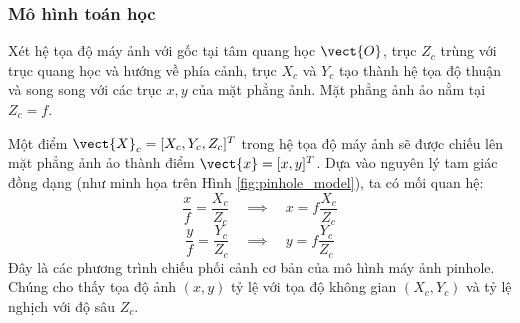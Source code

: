 \subsubsection{Mô hình toán học}

Xét hệ tọa độ máy ảnh với gốc tại tâm quang học $\vect{O}$, trục $Z_c$ trùng với trục quang học và hướng về phía cảnh, trục $X_c$ và $Y_c$ tạo thành hệ tọa độ thuận và song song với các trục $x, y$ của mặt phẳng ảnh. Mặt phẳng ảnh ảo nằm tại $Z_c = f$.

Một điểm $\vect{X}_c = [X_c, Y_c, Z_c]^T$ trong hệ tọa độ máy ảnh sẽ được chiếu lên mặt phẳng ảnh ảo thành điểm $\vect{x} = [x, y]^T$. Dựa vào nguyên lý tam giác đồng dạng (như minh họa trên Hình \ref{fig:pinhole_model}), ta có mối quan hệ:
\begin{equation} \label{eq:pinhole_projection}
\frac{x}{f} = \frac{X_c}{Z_c} \quad \implies \quad x = f \frac{X_c}{Z_c}
\end{equation}
\begin{equation} \label{eq:pinhole_projection_y}
\frac{y}{f} = \frac{Y_c}{Z_c} \quad \implies \quad y = f \frac{Y_c}{Z_c}
\end{equation}
Đây là các phương trình chiếu phối cảnh cơ bản của mô hình máy ảnh pinhole. Chúng cho thấy tọa độ ảnh $(x, y)$ tỷ lệ với tọa độ không gian $(X_c, Y_c)$ và tỷ lệ nghịch với độ sâu $Z_c$.

